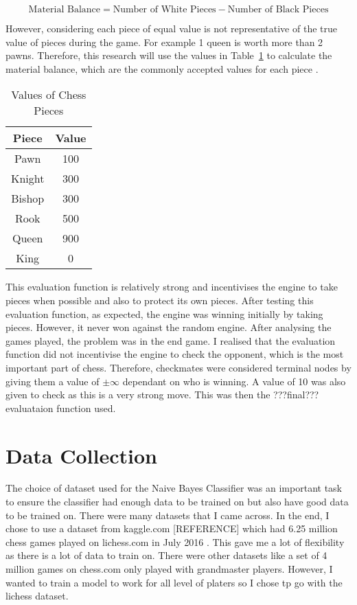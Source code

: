 \begin{equation}
    \label{eq:material_1}
    \text{Material Balance} = \text{Number of White Pieces} - \text{Number of Black Pieces} 
\end{equation}


However, considering each piece of equal value is not representative of the true value of pieces during the game. For example 1 queen is worth more than 2 pawns. Therefore, this research will use the values in Table~\ref{tab:values} to calculate the material balance, which are the commonly accepted values for each piece \cite{guptaDeterminingChessPiece2023}.

\begin{table}[h]
    \centering
    \begin{tabular}{|c|c|}
        \hline
        \textbf{Piece} & \textbf{Value} \\
        \hline
        Pawn & 100 \\
        Knight & 300 \\
        Bishop & 300 \\
        Rook & 500 \\
        Queen & 900 \\
        King & 0 \\
        \hline
    \end{tabular}
    \caption{Values of Chess Pieces}
    \label{tab:values}
\end{table}

This evaluation function is relatively strong and incentivises the engine to take pieces when possible and also to protect its own pieces. After testing this evaluation function, as expected, the engine was winning initially by taking pieces. However, it never won against the random engine. After analysing the games played, the problem was in the end game. I realised that the evaluation function did not incentivise the engine to check the opponent, which is the most important part of chess. Therefore, checkmates were considered terminal nodes by giving them a value of $\pm \infty$ dependant on who is winning. A value of 10 was also given to check as this is a very strong move. This was then the ???final??? evaluataion function used.


\section{Data Collection}

The choice of dataset used for the Naive Bayes Classifier was an important task to ensure the classifier had enough data to be trained on but also have good data to be trained on. There were many datasets that I came across. In the end, I chose to use a dataset from kaggle.com [REFERENCE] which had 6.25 million chess games played on lichess.com in July 2016 . This gave me a lot of flexibility as there is a lot of data to train on. There were other datasets like a set of 4 million games on chess.com only played with grandmaster players. However, I wanted to train a model to work for all level of platers so I chose tp go with the lichess dataset. 

